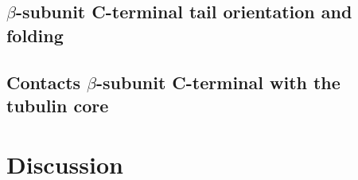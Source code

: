 \documentclass[a4paper]{article}
\begin{document}
\subsection{$\beta$-subunit C-terminal tail orientation and folding}


\subsection{Contacts $\beta$-subunit C-terminal with the tubulin core}


\section{Discussion}
\end{document}
